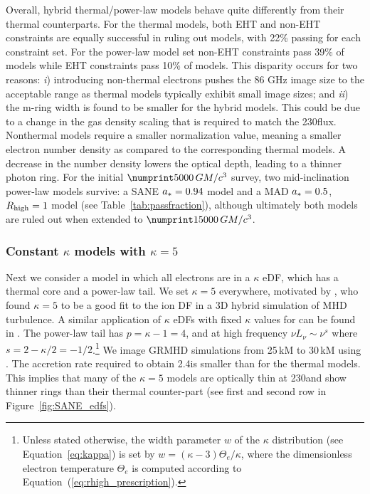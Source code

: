 Overall, \hamr hybrid thermal/power-law models behave quite differently from their thermal counterparts.
For the thermal models, both EHT and non-EHT constraints are equally successful in ruling out models, with 22\% passing for each constraint set. For the power-law model set non-EHT constraints pass 39\% of models while EHT constraints pass 10\% of models.
This disparity occurs for two reasons:
\emph{i}) introducing non-thermal electrons pushes the 86 GHz image size to the acceptable range as thermal models typically exhibit small image sizes; and
\emph{ii}) the m-ring width is found to be smaller for the hybrid models.
This could be due to a change in the gas density scaling that is required to match the 230\GHz flux.
Nonthermal models require a smaller normalization value, meaning a smaller electron number density as compared to the corresponding thermal models.
A decrease in the number density lowers the optical depth, leading to a thinner photon ring.
For the initial $\no{5000}\,\tg$ survey, two mid-inclination power-law models survive: a SANE $a_*=0.94$ model and a MAD $a_*=0.5$, $R_\mathrm{high}=1$ model (see Table~\ref{tab:passfraction}), although ultimately both models are ruled out when extended to $\no{15000}\,\tg$.

\subsubsection{Constant \texorpdfstring{$\kappa$}{kappa} models with \texorpdfstring{$\kappa = 5$}{kappa = 5}}
\label{sec:constant_kappa}

Next we consider a model in which all electrons are in a $\kappa$ eDF, which has a thermal core and a power-law tail.
We set $\kappa = 5$ everywhere,  motivated by \citet{2016PhRvL.117w5101K}, who found $\kappa = 5$ to be a good fit to the ion DF in a 3D hybrid simulation of MHD turbulence.
A similar application of $\kappa$ eDFs with fixed $\kappa$ values for \sgra can be found in \citet{2018A&A...612A..34D}.
The power-law tail has $p = \kappa - 1 = 4$, and at high frequency $\nu L_\nu \sim \nu^s$ where $s = 2 - \kappa/2 = -1/2$.\footnote{Unless stated otherwise, the width parameter $w$ of the $\kappa$ distribution (see Equation~\ref{eq:kappa}) is set by $w = (\kappa - 3) \Theta_e/\kappa$, where the dimensionless electron temperature $\Theta_e$ is computed according to Equation~(\ref{eq:rhigh_prescription}).}
We image \bhac GRMHD simulations from 25\,kM to 30\,kM using \bhoss \citep{Younsi2012,Younsi2020}.
The accretion rate required to obtain 2.4\Jy is smaller than for the thermal models.
This implies that many of the $\kappa=5$ models are optically thin at 230\GHz and show thinner rings than their thermal counter-part (see first and second row in Figure~\ref{fig:SANE_edfs}).


